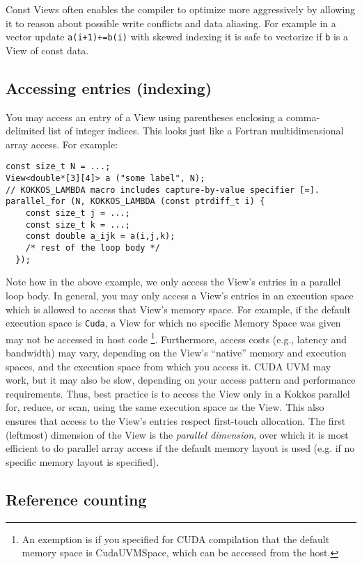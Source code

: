 Const Views often enables the compiler to optimize more aggressively by allowing it
to reason about possible write conflicts and data aliasing. For example in a vector
update \lstinline|a(i+1)+=b(i)| with skewed indexing it is safe to vectorize if
\lstinline|b| is a View of const data.

\subsection{Accessing entries (indexing)}

You may access an entry of a View using parentheses enclosing a
comma-delimited list of integer indices.  This looks just like a
Fortran multidimensional array access.  For example:
\begin{lstlisting}
const size_t N = ...;
View<double*[3][4]> a ("some label", N);
// KOKKOS_LAMBDA macro includes capture-by-value specifier [=].
parallel_for (N, KOKKOS_LAMBDA (const ptrdiff_t i) {
    const size_t j = ...;
    const size_t k = ...;
    const double a_ijk = a(i,j,k);
    /* rest of the loop body */
  });
\end{lstlisting}
Note how in the above example, we only access the View's entries in a
parallel loop body.  In general, you may only access a View's entries
in an execution space which is allowed to access that View's memory
space.  For example, if the default execution space is \lstinline!Cuda!, 
a View for which no specific Memory Space was given may not be accessed 
in host code \footnote{An exemption is if you specified for CUDA compilation
that the default memory space is CudaUVMSpace, which can be accessed from 
the host.}.
Furthermore, access costs (e.g., latency and
bandwidth) may vary, depending on the View's ``native'' memory and
execution spaces, and the execution space from which you access it.
CUDA UVM may work, but it may also be slow, depending on your access
pattern and performance requirements.  Thus, best practice is to
access the View only in a Kokkos parallel for, reduce, or scan, using
the same execution space as the View.  This also ensures that access
to the View's entries respect first-touch allocation.  The first
(leftmost) dimension of the View is the \emph{parallel dimension},
over which it is most efficient to do parallel array access if the 
default memory layout is used (e.g. if no specific memory layout is 
specified).

\subsection{Reference counting}


